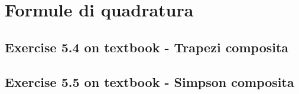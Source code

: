 \section{Formule di quadratura}

\subsection{Exercise 5.4 on textbook - Trapezi composita}
\label{subsec:exercise54}
 

\subsection{Exercise 5.5 on textbook - Simpson composita}
\label{subsec:scriptForExercise55}

